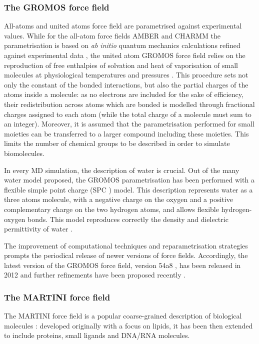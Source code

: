 \documentclass[graybox]{svmult}
\begin{document}
\subsubsection{The GROMOS force field}
All-atoms and united atoms force field are parametrised against experimental values.
%
While for the all-atom force fields AMBER and CHARMM the parametrisation is based on \emph{ab initio} quantum mechanics calculations refined against experimental data \cite{Maier2015,Dickson2014,Wang2004_amber,MacKerell1998,Klauda2010}, the united atom GROMOS force field relies on the reproduction of free enthalpies of solvation and heat of vaporisation of small molecules at physiological temperatures and pressures \cite{Oostenbrink2005,Schmid2011,Reif2013}.
%
This procedure sets not only the constant of the bonded interactions, but also the partial charges of the atoms inside a molecule: as no electrons are included for the sake of efficiency, their redistribution across atoms which are bonded is modelled through fractional charges assigned to each atom (while the total charge of a molecule must sum to an integer).
%
Moreover, it is assumed that the parametrisation performed for small moieties can be transferred to a larger compound including these moieties. This limits the number of chemical groups to be described in order to simulate biomolecules.

In every MD simulation, the description of water is crucial. Out of the many water model proposed, the GROMOS parametrisation has been performed with a flexible simple point charge (SPC \cite{Berendsen1981}) model. This description represents water as a three atoms molecule, with a negative charge on the oxygen and a positive complementary charge on the two hydrogen atoms, and allows flexible hydrogen-oxygen bonds. This model reproduces correctly the density and dielectric permittivity of water \cite{Mark2001}.

The improvement of computational techniques and reparametrisation strategies prompts the periodical release of newer versions of force fields. Accordingly, the latest version of the GROMOS force field, version 54a8 \cite{Reif2012}, has been released in 2012 and further refinements have been proposed recently \cite{Margreitter2017,Marzuoli2019}.

\subsubsection{The MARTINI force field}

The MARTINI force field is a popular coarse-grained description of biological molecules \cite{Marrink2007,Monticelli2008,DeJong2013}: developed originally with a focus on lipids, it has been then extended to include proteins, small ligands and DNA/RNA molecules.
\end{document}
